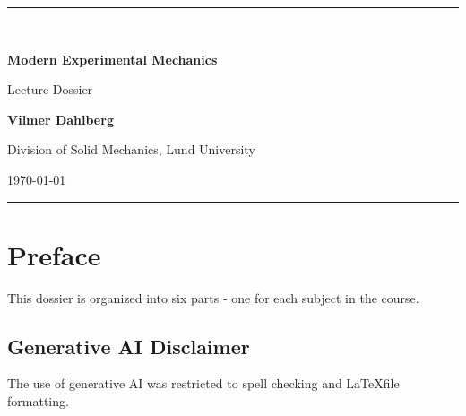 \documentclass[11pt,a4paper,oneside]{report}
\newcommand{\DossierTitle}{Modern Experimental Mechanics}
\newcommand{\DossierSubtitle}{Lecture Dossier}
\newcommand{\AuthorName}{Vilmer Dahlberg}
\newcommand{\Institution}{Division of Solid Mechanics, Lund University}
\newcommand{\DossierDate}{\today}
\begin{document}
\begin{titlepage}
  \thispagestyle{empty}
  \vspace*{22mm}
  {\color{DossierAccent}\rule{\textwidth}{2pt}}\\[14mm]
  {\Huge\bfseries\color{DossierInk}\DossierTitle\par}
  \vspace{5mm}
  {\Large\color{DossierMuted}\DossierSubtitle\par}
  \vfill
  {\large\bfseries\AuthorName\par}
  \vspace{2mm}
  {\Institution\par}
  \vspace{2mm}
  {\DossierDate\par}
  \vspace{14mm}
  {\color{DossierAccent}\rule{\textwidth}{2pt}}
\end{titlepage}

\chapter*{Preface}
This dossier is organized into six parts - one for each subject in the course. 

\section*{Generative AI Disclaimer}
The use of generative AI was restricted to spell checking and \LaTeX file formatting.


\tableofcontents
\clearpage
{}
















\end{document}
